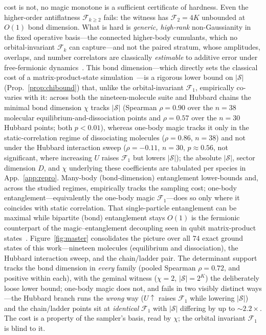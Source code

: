 cost is not, no magic monotone is a sufficient certificate of hardness. Even the higher-order
antiflatness $\mathcal F_{k\ge2}$ fails: the witness has $\mathcal F_2=4K$ unbounded at $O(1)$ bond
dimension. What is hard is \emph{generic, high-rank} non-Gaussianity in the fixed operative basis---the
connected higher-body cumulants, which no orbital-invariant $\mathcal F_k$ can capture---and not the
paired stratum, whose amplitudes, overlaps, and number correlators are classically \emph{estimable} to
additive error under free-fermionic dynamics~\cite{oh2026}.
This bond dimension---which directly sets the classical cost of a matrix-product-state
simulation~\cite{schollwock2011}---is a rigorous lower bound on $|\mathcal S|$ (Prop.~\ref{prop:chibound})
that, unlike the orbital-invariant $\mathcal F_1$, empirically co-varies with it: across both the
nineteen-molecule suite and Hubbard chains the minimal bond dimension $\chi$ tracks $|\mathcal S|$
(Spearman $\rho=0.90$ over the $n=38$ molecular equilibrium-and-dissociation points and $\rho=0.57$ over
the $n=30$ Hubbard points; both $p<0.01$), whereas one-body magic tracks it only in the
static-correlation regime of dissociating molecules ($\rho=0.86$, $n=38$) and not under the Hubbard
interaction sweep ($\rho=-0.11$, $n=30$, $p\approx0.56$, not significant, where increasing $U$ raises
$\mathcal F_1$ but lowers $|\mathcal S|$); the absolute $|\mathcal S|$, sector dimension $D$, and $\chi$
underlying these coefficients are tabulated per species in App.~\ref{app:repro}. Many-body
(bond-dimension) entanglement lower-bounds and, across the studied regimes, empirically tracks the
sampling cost; one-body entanglement---equivalently the one-body magic $\mathcal F_1$---does so only
where it coincides with static correlation. That single-particle entanglement can be maximal while
bipartite (bond) entanglement stays $O(1)$ is the fermionic counterpart of the magic--entanglement
decoupling seen in qubit matrix-product states~\cite{frautarabunga2024}.
Figure~\ref{fig:master} consolidates the picture over all $74$ exact ground states of this
work---nineteen molecules (equilibrium and dissociation), the Hubbard interaction sweep, and the
chain/ladder pair. The determinant support tracks the bond dimension in \emph{every} family (pooled
Spearman $\rho=0.72$, and positive within each), with the geminal witness ($\chi=2$, $|\mathcal S|=2^{K}$)
the deliberately loose lower bound; one-body magic does not, and fails in two visibly distinct ways---the
Hubbard branch runs the \emph{wrong} way ($U\!\uparrow$ raises $\mathcal F_1$ while lowering
$|\mathcal S|$) and the chain/ladder points sit at \emph{identical} $\mathcal F_1$ with $|\mathcal S|$
differing by up to $\sim\!2.2\times$. The cost is a property of the sampler's basis, read by $\chi$; the orbital
invariant $\mathcal F_1$ is blind to it.

